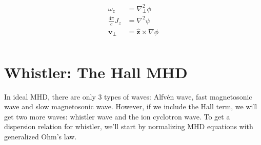 \documentclass[12pt]{article}
\newenvironment{changemargin}[2]{%
\begin{list}{}{%
\setlength{\topsep}{0pt}%
\setlength{\leftmargin}{#1}%
\setlength{\rightmargin}{#2}%
\setlength{\listparindent}{\parindent}%
\setlength{\itemindent}{\parindent}%
\setlength{\parsep}{\parskip}%
}%
\item[]}{\end{list}}
\begin{document}
\begin{changemargin}{-2cm}{-2cm}
\begin{align}
\begin{split}
            \omega_z &= \nabla_\perp^2\phi\\
            \frac{4\pi}{c}J_z &= \nabla^2 \psi\\
            \mathbf{v_\perp} &= \mathbf{\hat{z}}\times \nabla \phi\\
        \end{split}
    \end{align}

    \section{Whistler: The Hall MHD}
    In ideal MHD, there are only 3 types of waves: Alfv\'en wave, fast magnetosonic wave and slow magnetosonic wave. However, if
    we include the Hall term, we will get two more waves: whistler wave and the ion cyclotron wave.\cite{article4} To get a dispersion relation for whistler, we'll start by normalizing MHD equations with generalized Ohm's law.


\end{changemargin}
\end{document}
